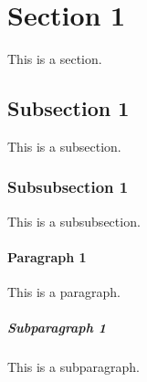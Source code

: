 \documentclass{article}
\begin{document}
    \section{Section 1}
    This is a section.
        \subsection{Subsection 1}
        This is a subsection.
            \subsubsection{Subsubsection 1}
            This is a subsubsection.
                \paragraph{Paragraph 1}
                This is a paragraph.
                    \subparagraph{Subparagraph 1}
                    This is a subparagraph.
\end{document}
